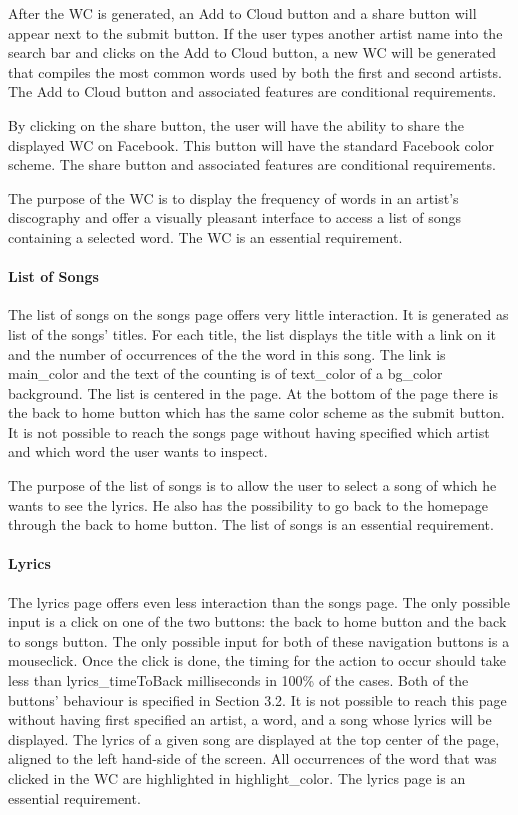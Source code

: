 \documentclass[]{article}
\begin{document}
After the WC is generated, an Add to Cloud button and a share button
will appear next to the submit button. If the user types another artist
name into the search bar and clicks on the Add to Cloud button, a new WC
will be generated that compiles the most common words used by both the
first and second artists. The Add to Cloud button and associated
features are conditional requirements.

By clicking on the share button, the user will have the ability to share
the displayed WC on Facebook. This button will have the standard
Facebook color scheme. The share button and associated features are
conditional requirements.

The purpose of the WC is to display the frequency of words in an
artist's discography and offer a visually pleasant interface to access a
list of songs containing a selected word. The WC is an essential
requirement.

\paragraph{List of Songs}\label{list-of-songs}

The list of songs on the songs page offers very little interaction. It
is generated as list of the songs' titles. For each title, the list
displays the title with a link on it and the number of occurrences of
the the word in this song. The link is main\_color and the text of the
counting is of text\_color of a bg\_color background. The list is
centered in the page. At the bottom of the page there is the back to
home button which has the same color scheme as the submit button. It is
not possible to reach the songs page without having specified which
artist and which word the user wants to inspect.

The purpose of the list of songs is to allow the user to select a song
of which he wants to see the lyrics. He also has the possibility to go
back to the homepage through the back to home button. The list of songs
is an essential requirement.

\paragraph{Lyrics}\label{lyrics}

The lyrics page offers even less interaction than the songs page. The
only possible input is a click on one of the two buttons: the back to
home button and the back to songs button. The only possible input for
both of these navigation buttons is a mouseclick. Once the click is
done, the timing for the action to occur should take less than
lyrics\_timeToBack milliseconds in 100\% of the cases. Both of the
buttons' behaviour is specified in Section 3.2. It is not possible to
reach this page without having first specified an artist, a word, and a
song whose lyrics will be displayed. The lyrics of a given song are
displayed at the top center of the page, aligned to the left hand-side
of the screen. All occurrences of the word that was clicked in the WC
are highlighted in highlight\_color. The lyrics page is an essential
requirement.
\end{document}

